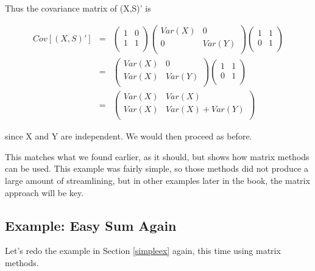 Thus the covariance matrix of (X,S)' is

\begin{eqnarray}
Cov[(X,S)']&=& 
   \left (
   \begin{array}{rr}
   1 & 0 \\
   1 & 1 \\
   \end{array}
   \right )
   \left (
   \begin{array}{cc}
   Var(X) & 0 \\
   0 & Var(Y) \\
   \end{array}
   \right )
   \left (
   \begin{array}{rr}
   1 & 1 \\
   0 & 1 \\
   \end{array}
   \right ) \\
&=&
   \left (
   \begin{array}{cc}
   Var(X) & 0 \\
   Var(X) & Var(Y) \\
   \end{array}
   \right )
   \left (
   \begin{array}{rr}
   1 & 1 \\
   0 & 1 \\
   \end{array}
   \right ) \\ 
&=&
   \left (
   \begin{array}{cc}
   Var(X) & Var(X) \\
   Var(X) & Var(X) + Var(Y) \\
   \end{array}
   \right )
\end{eqnarray}

since X and Y are independent.  We would then proceed as before.

This matches what we found earlier, as it should, but shows how matrix
methods can be used.  This example was fairly simple, so those methods
did not produce a large amount of streamlining, but in other examples
later in the book, the matrix approach will be key.

\subsection{Example:  Easy Sum Again}

Let's redo the example in Section \ref{simpleex} again, this time using
matrix methods.

